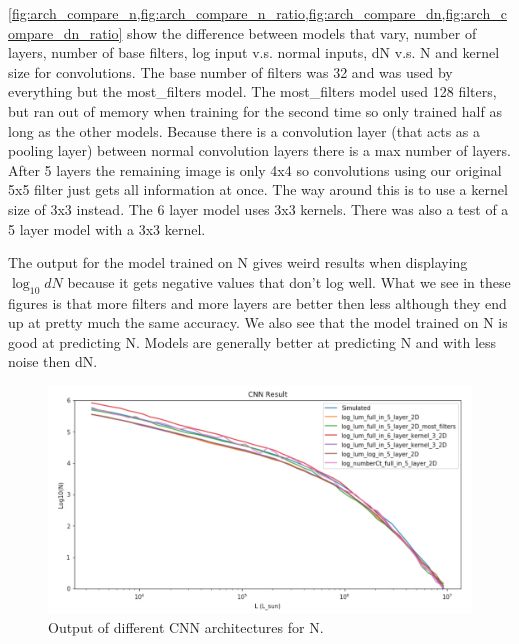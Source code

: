 \documentclass{article}
\begin{document}
			\cref{fig:arch_compare_n,fig:arch_compare_n_ratio,fig:arch_compare_dn,fig:arch_compare_dn_ratio} show the difference between models that vary, number of layers, number of base filters, log input v.s. normal inputs, dN v.s. N and kernel size for convolutions.  The base number of filters was 32 and was used by everything but the most\_filters model.  The most\_filters model used 128 filters, but ran out of memory when training for the second time so only trained half as long as the other models.  Because there is a convolution layer (that acts as a pooling layer) between normal convolution layers there is a max number of layers.  After 5 layers the remaining image is only 4x4 so convolutions using our original 5x5 filter just gets all information at once.  The way around this is to use a kernel size of 3x3 instead.  The 6 layer model uses 3x3 kernels.  There was also a test of a 5 layer model with a 3x3 kernel.

			The output for the model trained on N gives weird results when displaying \(\log_{10} dN\) because it gets negative values that don't log well.  What we see in these figures is that more filters and more layers are better then less although they end up at pretty much the same accuracy.  We also see that the model trained on N is good at predicting N.  Models are generally better at predicting N and with less noise then dN.

			\begin{figure}[H]
				\centering
				\includegraphics[width=1.0\textwidth]{arch_compare_n.pdf}
				\caption{Output of different CNN architectures for N.}
				\label{fig:arch_compare_n}
			\end{figure}
\end{document}
